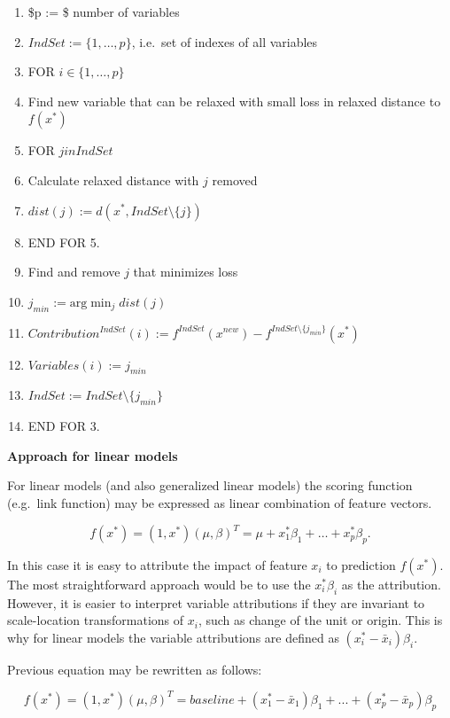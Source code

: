 \documentclass[]{book}
\providecommand{\tightlist}{%
  \setlength{\itemsep}{0pt}\setlength{\parskip}{0pt}}
\theoremstyle{definition}
\theoremstyle{definition}
\theoremstyle{definition}
\theoremstyle{remark}
\begin{document}
\begin{enumerate}
\def\labelenumi{\arabic{enumi}.}
\tightlist
\item
  \$p := \$ number of variables
\item
  \(IndSet := \{1, \ldots, p\}\), i.e.~set of indexes of all variables
\item
  FOR \(i \in \{1, \ldots, p\}\)
\item
  Find new variable that can be relaxed with small loss in relaxed
  distance to \(f(x^{*})\)
\item
  FOR \(j in IndSet\)
\item
  Calculate relaxed distance with \(j\) removed
\item
  \(dist(j) := d(x^{*}, IndSet \setminus \{j\})\)
\item
  END FOR 5.
\item
  Find and remove \(j\) that minimizes loss
\item
  \(j_{min} := \text{arg}\min_j dist(j)\)
\item
  \(Contribution^{IndSet}(i) := f^{IndSet}(x^{new}) - f^{IndSet \setminus \{j_{min}\}}(x^{*})\)
\item
  \(Variables(i) := j_{min}\)
\item
  \(IndSet := IndSet \setminus \{j_{min}\}\)
\item
  END FOR 3.
\end{enumerate}

\textbf{Approach for linear models}

For linear models (and also generalized linear models) the scoring
function (e.g.~link function) may be expressed as linear combination of
feature vectors.

\[
f(x^{*}) = (1, x^{*}) (\mu, \beta)^T = \mu + x^{*}_1 \beta_1 + \ldots + x^{*}_p \beta_p.
\]

In this case it is easy to attribute the impact of feature \(x_i\) to
prediction \(f(x^{*})\). The most straightforward approach would be to
use the \(x^{*}_i \beta_i\) as the attribution. However, it is easier to
interpret variable attributions if they are invariant to scale-location
transformations of \(x_i\), such as change of the unit or origin. This
is why for linear models the variable attributions are defined as
\((x^{*}_i - \bar x_i) \beta_i\).

Previous equation may be rewritten as follows:

\[
f(x^{*}) = (1, x^{*}) (\mu, \beta)^T = baseline + (x^{*}_1 - \bar x_1) \beta_1 + ... + (x^{*}_p - \bar x_p) \beta_p
\]
\end{document}

